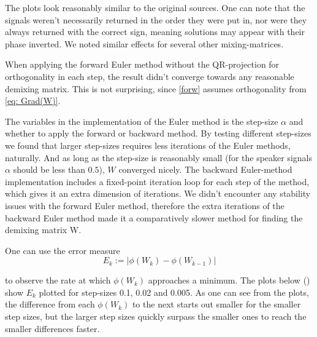 The plots look reasonably similar to the original sources. One can note that the signals weren't necessarily returned in the order they were put in, nor were they always returned with the correct sign, meaning solutions may appear with their phase inverted. We noted similar effects for several other mixing-matrices.

When applying the forward Euler method without the QR-projection for orthogonality in each step, the result didn't converge towards any reasonable demixing matrix. This is not surprising, since \cref{forw} assumes orthogonality from \cref{eq: Grad(W)}.

The variables in the implementation of the Euler method is the step-size $\alpha$ and whether to apply the forward or backward method. By testing different step-sizes we found that larger step-sizes requires less iterations of the Euler methods, naturally. And as long as the step-size is reasonably small (for the speaker signals $\alpha$ should be less than $0.5$), $W$ converged nicely. The backward Euler-method implementation includes a fixed-point iteration loop for each step of the method, which gives it an extra dimension of iterations. We didn't encounter any stability issues with the forward Euler method, therefore the extra iterations of the backward Euler method made it a comparatively slower method for finding the demixing matrix W. 

One can use the error measure
\begin{equation}
E_k := |\phi(W_k) - \phi(W_{k-1})|
\end{equation}

to observe the rate at which $\phi(W_k)$ approaches a minimum. The plots below () show $E_k$ plotted for step-sizes 0.1, 0.02 and 0.005. As one can see from the plots, the difference from each $\phi(W_k)$ to the next starts out smaller for the smaller step sizes, but the larger step sizes quickly surpass the smaller ones to reach the smaller differences faster.

